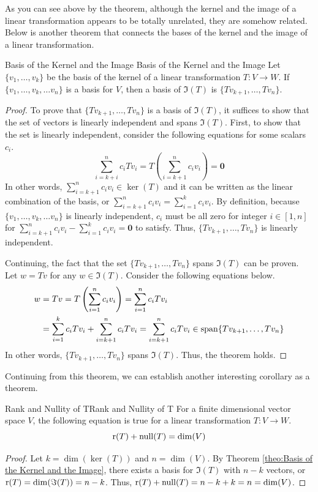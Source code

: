 \documentclass[../main.tex]{subfiles}
\begin{document}
As you can see above by the theorem, although the kernel and the
image of a linear transformation appears to be totally unrelated,
they are somehow related. Below is another theorem that connects
the bases of the kernel and the image of a linear transformation.

\begin{theorem}{Basis of the Kernel and the Image}
{Basis of the Kernel and the Image}
Let $\{ v_1, \ldots, v_k \}$ be the basis of the kernel of a
linear transformation $T: V \to W$. If $\{ v_1, \ldots, v_k, \ldots
v_n \}$ is a basis for $V$, then a basis of $\Im(T)$ is $\{ Tv_{k+1},
\ldots, Tv_n \}$.
\end{theorem}
\begin{proof}
To prove that $\{ Tv_{k+1}, \ldots, Tv_n \}$ is a basis of $\Im(T)$,
it suffices to show that the set of vectors is linearly independent
and spans $\Im(T)$. First, to show that the set is linearly
independent, consider the following equations for some scalars $c_i$.
\[
\sum_{i=k+i}^n c_i Tv_i
= T \left( \sum_{i=k+1}^n c_i v_i \right)
= \mathbf{0}
\]
In other words, $\sum_{i=k+1}^n c_i v_i \in \ker(T)$ and it can
be written as the linear combination of the basis, or $\sum_{i=k+1}^n
c_i v_i = \sum_{i=1}^k c_i v_i$. By definition, because $\{ v_1,
\ldots, v_k, \ldots v_n \}$ is linearly independent, $c_i$ must be
all zero for integer $i \in [1, n]$ for $\sum_{i=k+1}^n c_i v_i -
\sum_{i=1}^k c_i v_i = \mathbf{0}$ to satisfy. Thus, $\{ Tv_{k+1},
\ldots, Tv_n \}$ is linearly independent.

Continuing, the fact that the set $\{ Tv_{k+1}, \ldots, Tv_n \}$
spans $\Im(T)$ can be proven. Let $w = Tv$ for any $w \in \Im(T)$.
Consider the following equations below.
\begin{align*}
    w
    &= Tv
    = T \left( \sum_{i=1}^n c_i v_i \right)
    = \sum_{i=1}^n c_i Tv_i \\
    &= \sum_{i=1}^k c_i Tv_i + \sum_{i=k+1}^n c_i Tv_i
    = \sum_{i=k+1}^n c_i Tv_i
    \in \operatorname{span}\{ Tv_{k+1}, \ldots, Tv_n \}
\end{align*}
In other words, $\{ Tv_{k+1}, \ldots, Tv_n \}$ spans $\Im(T)$. Thus,
the theorem holds.
\end{proof}

Continuing from this theorem, we can establish another interesting
corollary as a theorem.

\begin{theorem}{Rank and Nullity of T}{Rank and Nullity of T}
For a finite dimensional vector space $V$, the following equation
is true for a linear transformation $T: V \to W$.
\vspace{-0.8\baselineskip}
\[
\operatorname{r}(T) + \operatorname{null}(T) = \dim(V)
\]
\end{theorem}
\begin{proof}
Let $k = \dim(\ker(T))$ and $n = \dim(V)$. By Theorem \ref{theo:Basis
of the Kernel and the Image}, there exists a basis for $\Im(T)$ with
$n - k$ vectors, or $\operatorname{r}(T) = \dim(\Im(T)) = n - k$. Thus,
$\operatorname{r}(T) + \operatorname{null}(T) = n - k + k = n = \dim(V)$.
\end{proof}
\end{document}
